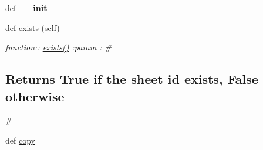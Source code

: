 \begin{DoxyCompactItemize}
\item 
def {\bfseries \+\_\+\+\_\+init\+\_\+\+\_\+}\hypertarget{classplume-creator_1_1src_1_1plume_1_1data_1_1property_1_1db__property_1_1_db_property_a90e356e3844b04896c86b230db6b7208}{}\label{classplume-creator_1_1src_1_1plume_1_1data_1_1property_1_1db__property_1_1_db_property_a90e356e3844b04896c86b230db6b7208}

\item 
def \hyperlink{classplume-creator_1_1src_1_1plume_1_1data_1_1property_1_1db__property_1_1_db_property_ab920219b9f18e3121d374f4f97aa17a5}{exists} (self)\hypertarget{classplume-creator_1_1src_1_1plume_1_1data_1_1property_1_1db__property_1_1_db_property_ab920219b9f18e3121d374f4f97aa17a5}{}\label{classplume-creator_1_1src_1_1plume_1_1data_1_1property_1_1db__property_1_1_db_property_ab920219b9f18e3121d374f4f97aa17a5}

\begin{DoxyCompactList}\small\item\em function\+:\+: \hyperlink{classplume-creator_1_1src_1_1plume_1_1data_1_1property_1_1db__property_1_1_db_property_ab920219b9f18e3121d374f4f97aa17a5}{exists()} \+:param \+: \# \subsection*{Returns True if the sheet id exists, False otherwise}

\# \end{DoxyCompactList}\item 
def \hyperlink{classplume-creator_1_1src_1_1plume_1_1data_1_1property_1_1db__property_1_1_db_property_a29947e796c856a63654725a685507e63}{copy}\hypertarget{classplume-creator_1_1src_1_1plume_1_1data_1_1property_1_1db__property_1_1_db_property_a29947e796c856a63654725a685507e63}{}\label{classplume-creator_1_1src_1_1plume_1_1data_1_1property_1_1db__property_1_1_db_property_a29947e796c856a63654725a685507e63}


\end{DoxyCompactItemize}
